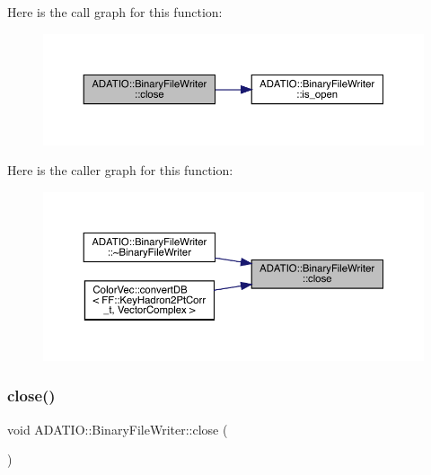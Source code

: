 Here is the call graph for this function\+:\nopagebreak
\begin{figure}[H]
\begin{center}
\leavevmode
\includegraphics[width=350pt]{dc/d11/classADATIO_1_1BinaryFileWriter_a20a1bdb753aaf28e60de49e80ddf953d_cgraph}
\end{center}
\end{figure}
Here is the caller graph for this function\+:\nopagebreak
\begin{figure}[H]
\begin{center}
\leavevmode
\includegraphics[width=350pt]{dc/d11/classADATIO_1_1BinaryFileWriter_a20a1bdb753aaf28e60de49e80ddf953d_icgraph}
\end{center}
\end{figure}
\mbox{\label{classADATIO_1_1BinaryFileWriter_a20a1bdb753aaf28e60de49e80ddf953d}} 
\subsubsection{\texorpdfstring{close()}{close()}\hspace{0.1cm}{\footnotesize\ttfamily [2/2]}}
{\footnotesize\ttfamily void A\+D\+A\+T\+I\+O\+::\+Binary\+File\+Writer\+::close (\begin{DoxyParamCaption}{ }\end{DoxyParamCaption})}




